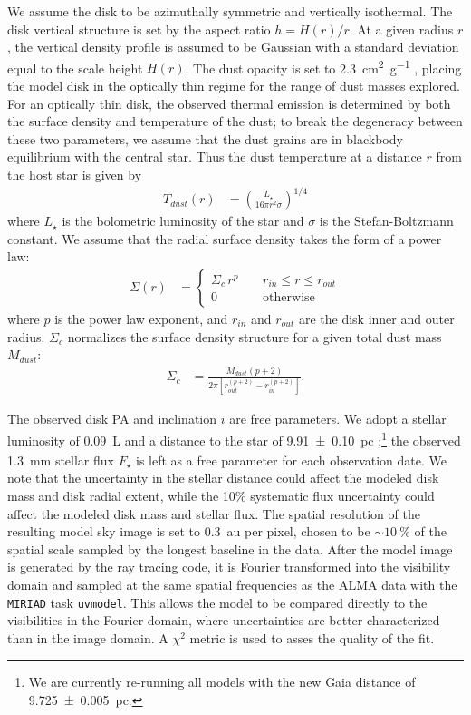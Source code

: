 \documentclass[modern]{aastex62}
\begin{document}
We assume the disk to be azimuthally symmetric and vertically isothermal. 
The disk vertical structure is set by the aspect ratio $h = H(r)/r$. 
At a given radius $r$, the vertical density profile is assumed to be Gaussian with a standard deviation equal to the scale height $H(r)$.
The dust opacity is set to \SI{2.3}{\cm^2.\gram^{-1}} \citep{beckwith90}, placing the model disk in the optically thin regime for the range of dust masses explored.
For an optically thin disk, the observed thermal emission is determined by both the surface density and temperature of the dust; to break the degeneracy between these two parameters, we assume that the dust grains are in blackbody equilibrium with the central star.
Thus the dust temperature at a distance $r$ from the host star is given by
\begin{align}
  T_{dust} (r) &= \left( \frac{L_{\star}}{16 \pi r^2 \sigma} \right)^{1/4}
\end{align}
where $L_{\star}$ is the bolometric luminosity of the star and $\sigma$ is the Stefan-Boltzmann constant. We assume that the radial surface density takes the form of a power law: 
\begin{align}
  \Sigma(r) &= 
  \begin{cases}
    \Sigma_c \, r^{p} \; \; \; \; & r_{in} \leq r \leq r_{out} \\
    0 \; \; \; \; &\mbox{otherwise} 
  \end{cases}
\end{align}
where $p$ is the power law exponent, and $r_{in}$ and $r_{out}$ are the disk inner and outer radius. 
$\Sigma_c$ normalizes the surface density structure for a given total dust mass $M_{dust}$:
\begin{align}
\Sigma_c &= \frac{M_{dust} \left(p + 2 \right)}{2 \pi \left[ r_{out}^{(p+2)} - r_{in}^{(p+2)} \right]}.
\end{align}

The observed disk PA and inclination $i$ are free parameters.
We adopt a stellar luminosity of \SI{0.09}{L_\sun} \citep{plavchan09} and a distance to the star of \SI{9.91 \pm 0.10}{pc} \citep{vanleeuwen07};\footnote{We are currently re-running all models with the new Gaia distance of \SI{9.725 \pm 0.005}{pc}.} the observed \SI{1.3}{mm} stellar flux $F_\star$ is left as a free parameter for each observation date.
We note that the uncertainty in the stellar distance could affect the modeled disk mass and disk radial extent, while the 10\% systematic flux uncertainty could affect the modeled disk mass and stellar flux.
The spatial resolution of the resulting model sky image is set to \SI{0.3}{au} per pixel, chosen to be $\sim \SI{10}{\percent}$ of the spatial scale sampled by the longest baseline in the data. 
After the model image is generated by the ray tracing code, it is Fourier transformed into the visibility domain and sampled at the same spatial frequencies as the ALMA data with the \texttt{MIRIAD} task \texttt{uvmodel}.
This allows the model to be compared directly to the visibilities in the Fourier domain, where uncertainties are better characterized than in the image domain.
A $\chi^2$ metric is used to asses the quality of the fit.
\end{document}
